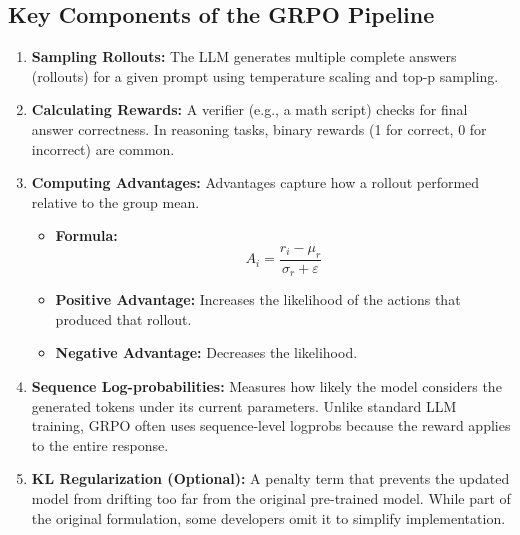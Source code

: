 \subsection{Key Components of the GRPO Pipeline}

\begin{enumerate}
    \item \textbf{Sampling Rollouts:} The LLM generates multiple complete answers (rollouts) for a given prompt using temperature scaling and top-p sampling.
    \item \textbf{Calculating Rewards:} A verifier (e.g., a math script) checks for final answer correctness. In reasoning tasks, binary rewards (1 for correct, 0 for incorrect) are common.
    \item \textbf{Computing Advantages:} Advantages capture how a rollout performed relative to the group mean.
    \begin{itemize}
        \item \textbf{Formula:}
        \begin{equation}
            \label{eq:grpo-advantage}
            A_i = \frac{r_i - \mu_r}{\sigma_r + \varepsilon}
        \end{equation}
        \item \textbf{Positive Advantage:} Increases the likelihood of the actions that produced that rollout.
        \item \textbf{Negative Advantage:} Decreases the likelihood.
    \end{itemize}
    \item \textbf{Sequence Log-probabilities:} Measures how likely the model considers the generated tokens under its current parameters. Unlike standard LLM training, GRPO often uses sequence-level logprobs because the reward applies to the entire response.
    \item \textbf{KL Regularization (Optional):} A penalty term that prevents the updated model from drifting too far from the original pre-trained model. While part of the original formulation, some developers omit it to simplify implementation.
\end{enumerate}


